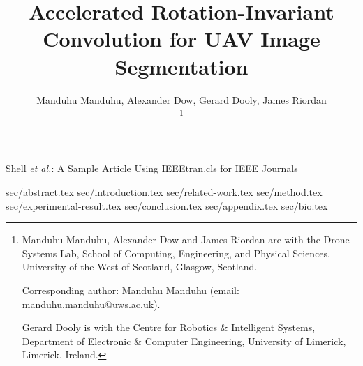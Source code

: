 \documentclass[lettersize,journal]{IEEEtran}
\theoremstyle{plain}
\theoremstyle{definition}
\begin{document}

\title{Accelerated Rotation-Invariant Convolution for UAV Image Segmentation}

\author{Manduhu Manduhu, Alexander Dow, Gerard Dooly, James Riordan %
       
\thanks{
	Manduhu Manduhu, Alexander Dow and James Riordan are with the Drone Systems Lab, School of Computing, Engineering, and Physical Sciences, University of the West of Scotland, Glasgow, Scotland. 

	Corresponding author: Manduhu Manduhu (email: manduhu.manduhu@uws.ac.uk). 
	
	Gerard Dooly is with the Centre for Robotics \& Intelligent Systems, Department of Electronic \& Computer Engineering, University of Limerick, Limerick, Ireland.
	
	}
}

%
{Shell \MakeLowercase{\textit{et al.}}: A Sample Article Using IEEEtran.cls for IEEE Journals}


\maketitle

 {sec/abstract.tex}
 {sec/introduction.tex}
 {sec/related-work.tex}
 {sec/method.tex}
 {sec/experimental-result.tex}
 {sec/conclusion.tex}
\appendices
 {sec/appendix.tex}
 {sec/bio.tex}
\end{document}

